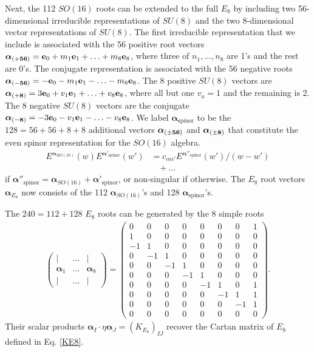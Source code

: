 Next, the 112 $SO(16)$ roots can be extended to the full $E_8$ by including two 56-dimensional irreducible representations of $SU(8)$ and the two 8-dimensional vector representations of $SU(8)$. The first irreducible representation that we include is associated with the 56 positive root vectors $\boldsymbol\alpha_{(+{\bf56})}={\bf e}_0+m_1{\bf e}_1+\ldots+m_8{\bf e}_8$, where three of $n_1,\ldots,n_8$ are 1's and the rest are 0's. The conjugate representation is associated with the 56 negative roots $\boldsymbol\alpha_{(-{\bf56})}=-{\bf e}_0-m_1{\bf e}_1-\ldots-m_8{\bf e}_8$. The 8 positive $SU(8)$ vectors are $\boldsymbol\alpha_{(+{\bf8})}=3{\bf e}_0+v_1{\bf e}_1+\ldots+v_8{\bf e}_8$, where all but one $v_a=1$ and the remaining is 2. The 8 negative $SU(8)$ vectors are the conjugate $\boldsymbol\alpha_{(-{\bf8})}=-3{\bf e}_0-v_1{\bf e}_1-\ldots-v_8{\bf e}_8$. We label $\boldsymbol\alpha_{\mathrm{spinor}}$ to be the $128=56+56+8+8$ additional vectors $\boldsymbol\alpha_{(\pm{\bf56})}$ and $\boldsymbol\alpha_{(\pm{\bf8})}$ that constitute the even spinor representation for the $SO(16)$ algebra. \begin{align}E^{\boldsymbol\alpha_{SO(16)}}(w)E^{\boldsymbol\alpha'_{\mathrm{spinor}}}(w')&=c_{\alpha\alpha'}E^{\boldsymbol\alpha''_{\mathrm{spinor}}}(w')/(w-w')\nonumber\\&\;\;\;+\ldots\end{align} if $\boldsymbol\alpha''_{\mathrm{spinor}}=\boldsymbol\alpha_{SO(16)}+\boldsymbol\alpha'_{\mathrm{spinor}}$, or non-singular if otherwise. The $E_8$ root vectors $\boldsymbol\alpha_{E_8}$ now consists of the 112 $\boldsymbol\alpha_{SO(16)}$'s and 128 $\boldsymbol\alpha_{\mathrm{spinor}}$'s.

The $240=112+128$ $E_8$ roots can be generated by the 8 simple roots \begin{gather}\begin{pmatrix}|&\ldots&|\\\boldsymbol\alpha_1&\ldots&\boldsymbol\alpha_8\\|&\ldots&|\end{pmatrix}=\left(\begin{smallmatrix}
0 & 0 & 0 & 0 & 0 & 0 & 0 & 1 \\
1 & 0 & 0 & 0 & 0 & 0 & 0 & 0 \\
-1 & 1 & 0 & 0 & 0 & 0 & 0 & 0 \\
0 & -1 & 1 & 0 & 0 & 0 & 0 & 0 \\
0 & 0 & -1 & 1 & 0 & 0 & 0 & 0 \\
0 & 0 & 0 & -1 & 1 & 0 & 0 & 0 \\
0 & 0 & 0 & 0 & -1 & 1 & 0 & 1 \\
0 & 0 & 0 & 0 & 0 & -1 & 1 & 1 \\
0 & 0 & 0 & 0 & 0 & 0 & -1 & 1 \\
0 & 0 & 0 & 0 & 0 & 0 & 0 & 0 \end{smallmatrix}\right).\label{E8simpleroots}\end{gather} Their scalar products $\boldsymbol\alpha_I\cdot\eta\boldsymbol\alpha_J=(K_{E_8})_{IJ}$ recover the Cartan matrix of $E_8$ defined in Eq. \eqref{KE8}.

